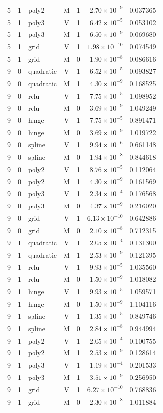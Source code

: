 \begin{longtable}{rrlcrrr}
5 & 1 & poly2 & M & 1 & $2.70\times10^{-9}$ & 0.037365 \\
5 & 1 & poly3 & V & 1 & $6.42\times10^{-5}$ & 0.053102 \\
5 & 1 & poly3 & M & 1 & $6.50\times10^{-9}$ & 0.069680 \\
5 & 1 & grid & V & 1 & $1.98\times10^{-10}$ & 0.074549 \\
5 & 1 & grid & M & 0 & $1.90\times10^{-8}$ & 0.086616 \\
9 & 0 & quadratic & V & 1 & $6.52\times10^{-5}$ & 0.093827 \\
9 & 0 & quadratic & M & 1 & $4.30\times10^{-9}$ & 0.168525 \\
9 & 0 & relu & V & 1 & $7.75\times10^{-5}$ & 1.098952 \\
9 & 0 & relu & M & 0 & $3.69\times10^{-9}$ & 1.049249 \\
9 & 0 & hinge & V & 1 & $7.75\times10^{-5}$ & 0.891471 \\
9 & 0 & hinge & M & 0 & $3.69\times10^{-9}$ & 1.019722 \\
9 & 0 & spline & V & 1 & $9.94\times10^{-6}$ & 0.661148 \\
9 & 0 & spline & M & 0 & $1.94\times10^{-8}$ & 0.844618 \\
9 & 0 & poly2 & V & 1 & $8.76\times10^{-5}$ & 0.112064 \\
9 & 0 & poly2 & M & 1 & $4.30\times10^{-9}$ & 0.161569 \\
9 & 0 & poly3 & V & 1 & $2.34\times10^{-4}$ & 0.176568 \\
9 & 0 & poly3 & M & 0 & $4.37\times10^{-9}$ & 0.216020 \\
9 & 0 & grid & V & 1 & $6.13\times10^{-10}$ & 0.642886 \\
9 & 0 & grid & M & 0 & $2.10\times10^{-8}$ & 0.712315 \\
9 & 1 & quadratic & V & 1 & $2.05\times10^{-4}$ & 0.131300 \\
9 & 1 & quadratic & M & 1 & $2.53\times10^{-9}$ & 0.121395 \\
9 & 1 & relu & V & 1 & $9.93\times10^{-5}$ & 1.035560 \\
9 & 1 & relu & M & 0 & $1.50\times10^{-9}$ & 1.018082 \\
9 & 1 & hinge & V & 1 & $9.93\times10^{-5}$ & 1.059571 \\
9 & 1 & hinge & M & 0 & $1.50\times10^{-9}$ & 1.104116 \\
9 & 1 & spline & V & 1 & $1.35\times10^{-5}$ & 0.849746 \\
9 & 1 & spline & M & 0 & $2.84\times10^{-8}$ & 0.944994 \\
9 & 1 & poly2 & V & 1 & $2.05\times10^{-4}$ & 0.100755 \\
9 & 1 & poly2 & M & 1 & $2.53\times10^{-9}$ & 0.128614 \\
9 & 1 & poly3 & V & 1 & $1.19\times10^{-4}$ & 0.201533 \\
9 & 1 & poly3 & M & 1 & $3.51\times10^{-9}$ & 0.256950 \\
9 & 1 & grid & V & 1 & $6.27\times10^{-10}$ & 0.768836 \\
9 & 1 & grid & M & 0 & $2.30\times10^{-8}$ & 1.011884 \\
\hline\end{longtable}\endgroup

